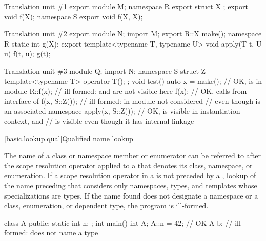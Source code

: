 \pnum
\begin{example}
\begin{codeblocktu}{Translation unit \#1}
export module M;
namespace R {
  export struct X {};
  export void f(X);
}
namespace S {
  export void f(X, X);
}
\end{codeblocktu}

\begin{codeblocktu}{Translation unit \#2}
export module N;
import M;
export R::X make();
namespace R { static int g(X); }
export template<typename T, typename U> void apply(T t, U u) {
  f(t, u);
  g(t);
}
\end{codeblocktu}

\begin{codeblocktu}{Translation unit \#3}
module Q;
import N;
namespace S {
  struct Z { template<typename T> operator T(); };
}
void test() {
  auto x = make();              // OK,  is  in module 
  R::f(x);                      // ill-formed:  and  are not visible here
  f(x);                         // OK, calls  from interface of 
  f(x, S::Z());                 // ill-formed:  in module  not considered
                                // even though  is an associated namespace
  apply(x, S::Z());             // OK,  is visible in instantiation context, and
                                //  is visible even though it has internal linkage
}
\end{codeblocktu}
\end{example}

[basic.lookup.qual]{Qualified name lookup}

\pnum
{}%
%
%
The name of a class or namespace member
or enumerator can be referred to after the
\tcode{::} scope resolution operator applied to a
 that denotes its class,
namespace, or enumeration.
If a
\tcode{::} scope resolution
operator
in a  is not preceded by a ,
lookup of the name preceding that \tcode{::} considers only namespaces, types, and
templates whose specializations are types. If the
name found does not designate a namespace or a class, enumeration, or dependent type,
the program is ill-formed.
\begin{example}
\begin{codeblock}
class A {
public:
  static int n;
};
int main() {
  int A;
  A::n = 42;        // OK
  A b;              // ill-formed:  does not name a type
}
\end{codeblock}
\end{example}

